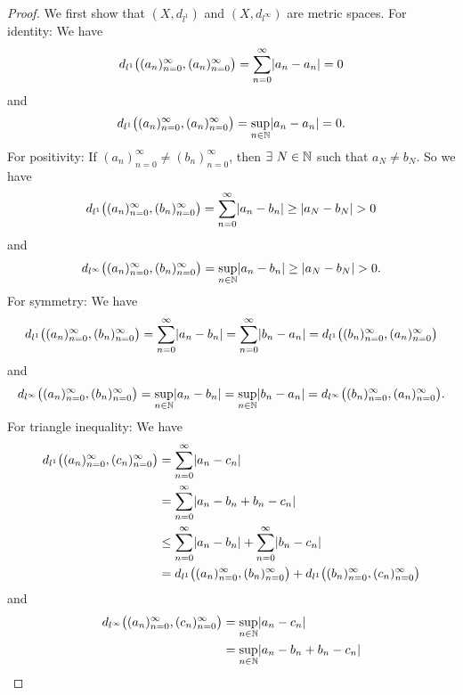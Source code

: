 \begin{proof}
  We first show that \((X, d_{l^1})\) and \((X, d_{l^\infty})\) are metric spaces.
  For identity:
  We have
  \[
    d_{l^1}\big((a_n)_{n = 0}^\infty, (a_n)_{n = 0}^\infty\big) = \sum_{n = 0}^\infty \abs{a_n - a_n} = 0
  \]
  and
  \[
    d_{l^1}\big((a_n)_{n = 0}^\infty, (a_n)_{n = 0}^\infty\big) = \sup_{n \in \N} \abs{a_n - a_n} = 0.
  \]
  For positivity:
  If \((a_n)_{n = 0}^\infty \neq (b_n)_{n = 0}^\infty\), then \(\exists\ N \in \mathbb{N}\) such that \(a_N \neq b_N\).
  So we have
  \[
    d_{l^1}\big((a_n)_{n = 0}^\infty, (b_n)_{n = 0}^\infty\big) = \sum_{n = 0}^\infty \abs{a_n - b_n} \geq \abs{a_N - b_N} > 0
  \]
  and
  \[
    d_{l^\infty}\big((a_n)_{n = 0}^\infty, (b_n)_{n = 0}^\infty\big) = \sup_{n \in \N} \abs{a_n - b_n} \geq \abs{a_N - b_N} > 0.
  \]
  For symmetry:
  We have
  \[
    d_{l^1}\big((a_n)_{n = 0}^\infty, (b_n)_{n = 0}^\infty\big) = \sum_{n = 0}^\infty \abs{a_n - b_n} = \sum_{n = 0}^\infty \abs{b_n - a_n} = d_{l^1}\big((b_n)_{n = 0}^\infty, (a_n)_{n = 0}^\infty\big)
  \]
  and
  \[
    d_{l^\infty}\big((a_n)_{n = 0}^\infty, (b_n)_{n = 0}^\infty\big) = \sup_{n \in \N} \abs{a_n - b_n} = \sup_{n \in \N} \abs{b_n - a_n} = d_{l^\infty}\big((b_n)_{n = 0}^\infty, (a_n)_{n = 0}^\infty\big).
  \]
  For triangle inequality:
  We have
  \begin{align*}
    d_{l^1}\big((a_n)_{n = 0}^\infty, (c_n)_{n = 0}^\infty\big) & = \sum_{n = 0}^\infty \abs{a_n - c_n}                                                                                       \\
                                                                & = \sum_{n = 0}^\infty \abs{a_n - b_n + b_n - c_n}                                                                           \\
                                                                & \leq \sum_{n = 0}^\infty \abs{a_n - b_n} + \sum_{n = 0}^\infty \abs{b_n - c_n}                                              \\
                                                                & = d_{l^1}\big((a_n)_{n = 0}^\infty, (b_n)_{n = 0}^\infty\big) + d_{l^1}\big((b_n)_{n = 0}^\infty, (c_n)_{n = 0}^\infty\big)
  \end{align*}
  and
  \begin{align*}
    d_{l^\infty}\big((a_n)_{n = 0}^\infty, (c_n)_{n = 0}^\infty\big) & = \sup_{n \in \N} \abs{a_n - c_n}                                                                                                      \\
                                                                     & = \sup_{n \in \N} \abs{a_n - b_n + b_n - c_n}                                                                                          \\

\end{align*}
\end{proof}
